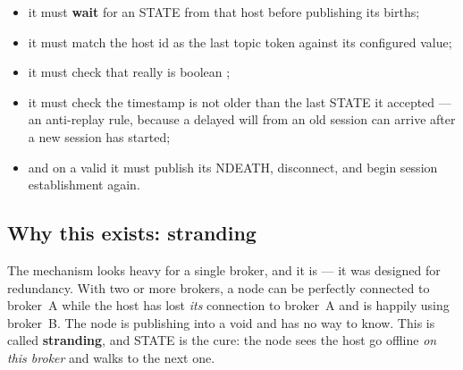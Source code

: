\begin{itemize}
  \item it must \textbf{wait} for an  STATE from that host before
        publishing its births;
  \item it must match the host id as the last topic token against its configured value;
  \item it must check that  really is boolean ;
  \item it must check the timestamp is not older than the last STATE it accepted --- an
        anti-replay rule, because a delayed will from an old session can arrive after a
        new session has started;
  \item and on a valid  it must publish its NDEATH, disconnect, and
        begin session establishment again.
\end{itemize}

\subsection{Why this exists: stranding}

The mechanism looks heavy for a single broker, and it is --- it was designed for
redundancy. With two or more brokers, a node can be perfectly connected to broker~A while
the host has lost \emph{its} connection to broker~A and is happily using broker~B. The
node is publishing into a void and has no way to know. This is called \textbf{stranding},
and STATE is the cure: the node sees the host go offline \emph{on this broker} and walks
to the next one.

\begin{center}
\end{center}

